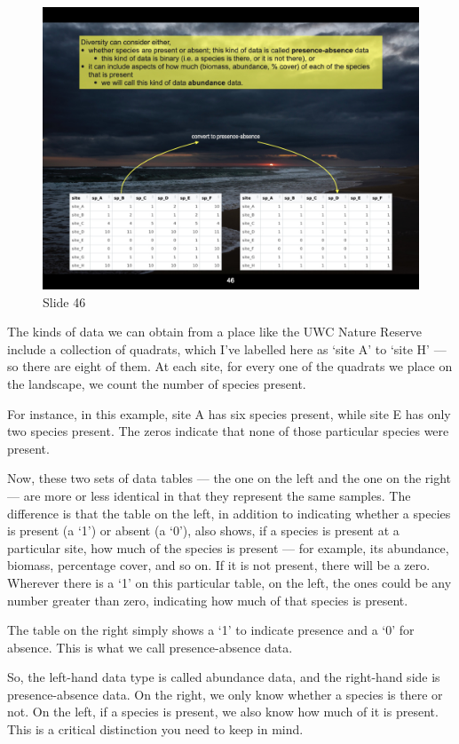 \documentclass[
  12pt,
]{book}
\begin{document}
\begin{figure}[ht]
\centering
\includegraphics[width=0.8\linewidth]{../images/BDC334/BDC334-046.jpeg}
\caption*{Slide 46}
\end{figure}

The kinds of data we can obtain from a place like the UWC Nature Reserve
include a collection of quadrats, which I've labelled here as `site A'
to `site H' --- so there are eight of them. At each site, for every one
of the quadrats we place on the landscape, we count the number of
species present.

For instance, in this example, site A has six species present, while
site E has only two species present. The zeros indicate that none of
those particular species were present.

Now, these two sets of data tables --- the one on the left and the one
on the right --- are more or less identical in that they represent the
same samples. The difference is that the table on the left, in addition
to indicating whether a species is present (a `1') or absent (a `0'),
also shows, if a species is present at a particular site, how much of
the species is present --- for example, its abundance, biomass,
percentage cover, and so on. If it is not present, there will be a zero.
Wherever there is a `1' on this particular table, on the left, the ones
could be any number greater than zero, indicating how much of that
species is present.

The table on the right simply shows a `1' to indicate presence and a `0'
for absence. This is what we call presence-absence data.

So, the left-hand data type is called abundance data, and the right-hand
side is presence-absence data. On the right, we only know whether a
species is there or not. On the left, if a species is present, we also
know how much of it is present. This is a critical distinction you need
to keep in mind.
\end{document}
